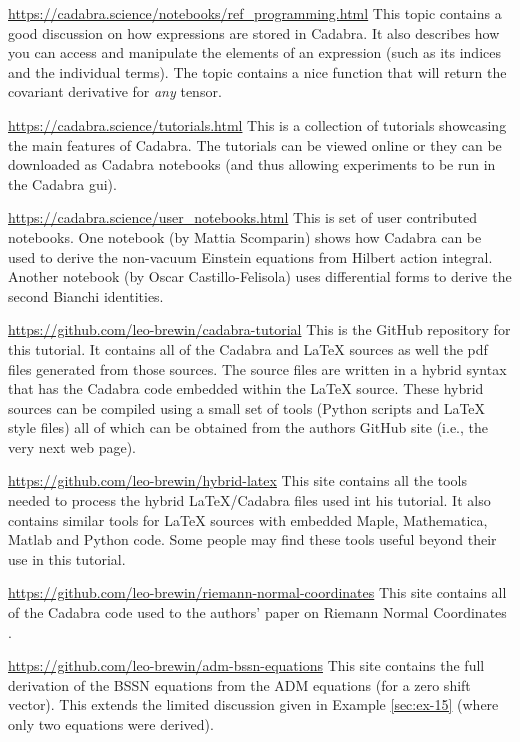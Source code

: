 \documentclass[a4paper,12pt]{article}
\numberwithin{equation}{section}%
\begin{document}
\url{https://cadabra.science/notebooks/ref_programming.html}\Break
This topic contains a good discussion on how expressions are stored in Cadabra. It also
describes how you can access and manipulate the elements of an expression (such as its
indices and the individual terms). The topic contains a nice function that will return the
covariant derivative for \emph{any} tensor.

\url{https://cadabra.science/tutorials.html}\Break
This is a collection of tutorials showcasing the main features of Cadabra. The tutorials can
be viewed online or they can be downloaded as Cadabra notebooks (and thus allowing
experiments to be run in the Cadabra gui).

\url{https://cadabra.science/user_notebooks.html}\Break
This is set of user contributed notebooks. One notebook (by Mattia Scomparin) shows how
Cadabra can be used to derive the non-vacuum Einstein equations from Hilbert action
integral. Another notebook (by Oscar Castillo-Felisola) uses differential forms to derive
the second Bianchi identities.

\url{https://github.com/leo-brewin/cadabra-tutorial}\Break
This is the GitHub repository for this tutorial. It contains all of the Cadabra and LaTeX
sources as well the pdf files generated from those sources. The source files are written in
a hybrid syntax that has the Cadabra code embedded within the LaTeX source. These hybrid
sources can be compiled using a small set of tools (Python scripts and LaTeX style files)
all of which can be obtained from the authors GitHub site (i.e., the very next web page).

\url{https://github.com/leo-brewin/hybrid-latex}\Break
This site contains all the tools needed to process the hybrid LaTeX/Cadabra files used
int his tutorial. It also contains similar tools for LaTeX sources with embedded Maple,
Mathematica, Matlab and Python code. Some people may find these tools useful beyond their
use in this tutorial.

\url{https://github.com/leo-brewin/riemann-normal-coordinates}\Break
This site contains all of the Cadabra code used to the authors' paper on Riemann Normal
Coordinates \cite{brewin:2009-02}.

\url{https://github.com/leo-brewin/adm-bssn-equations}\Break
This site contains the full derivation of the BSSN equations from the ADM equations (for a
zero shift vector). This extends the limited discussion given in Example \ref{sec:ex-15}
(where only two equations were derived).
\end{document}
